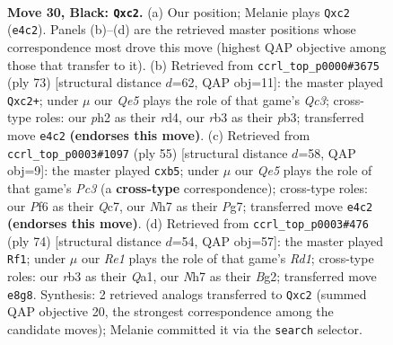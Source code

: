 \documentclass[11pt]{article}
\begin{document}
\clearpage

\begin{figure}[p]\centering
\begin{subfigure}{0.46\textwidth}\centering
\resizebox{\linewidth}{!}{%
\newchessgame
\chessboard[
  setfen={4r2k/p1pp3n/5p1Q/8/1PPPq3/1R6/2P2P1P/6K1 b - - 2 30},
  showmover=false,
  pgfstyle=straightmove, color=movearrow, markmove={e4-c2}
]}
\caption{}
\end{subfigure}\hfill
\begin{subfigure}{0.46\textwidth}\centering
\resizebox{\linewidth}{!}{%
\newchessgame
\chessboard[
  setfen={r5k1/p6p/1pq5/4Q2n/3R4/PP3PP1/2P3KP/8 b - - 1 37},
  showmover=false,
  pgfstyle=straightmove, color=movearrow, markmove={c6-c2}
]}
\caption{}
\end{subfigure}
\\[4pt]
\begin{subfigure}{0.46\textwidth}\centering
\resizebox{\linewidth}{!}{%
\newchessgame
\chessboard[
  setfen={r6k/2q2ppp/2p5/1P6/3Q1P2/1P6/6PP/5R1K b - - 0 28},
  showmover=false,
  pgfstyle=straightmove, color=movearrow, markmove={c6-b5}
]}
\caption{}
\end{subfigure}\hfill
\begin{subfigure}{0.46\textwidth}\centering
\resizebox{\linewidth}{!}{%
\newchessgame
\chessboard[
  setfen={6k1/3b1pp1/7p/2rp4/3N3P/3P2q1/6B1/Q2R2K1 w - - 0 38},
  showmover=false,
  pgfstyle=straightmove, color=movearrow, markmove={d1-f1}
]}
\caption{}
\end{subfigure}
\caption{\textbf{Move 30, Black: \texttt{Qxc2}.} (a) Our position; Melanie plays \texttt{Qxc2} (\texttt{e4c2}). Panels (b)--(d) are the retrieved master positions whose correspondence most drove this move (highest QAP objective among those that transfer to it). (b) Retrieved from \texttt{ccrl\_top\_p0000\#3675} (ply 73) [structural distance $d$=62, QAP obj=11]: the master played \texttt{Qxc2+}; under $\mu$ our \emph{Qe5} plays the role of that game's \emph{Qc3}; cross-type roles: our \emph{p}h2 as their \emph{r}d4, our \emph{r}b3 as their \emph{p}b3; transferred move \texttt{e4c2} \textbf{(endorses this move)}. (c) Retrieved from \texttt{ccrl\_top\_p0003\#1097} (ply 55) [structural distance $d$=58, QAP obj=9]: the master played \texttt{cxb5}; under $\mu$ our \emph{Qe5} plays the role of that game's \emph{Pc3} (a \textbf{cross-type} correspondence); cross-type roles: our \emph{P}f6 as their \emph{Q}c7, our \emph{N}h7 as their \emph{P}g7; transferred move \texttt{e4c2} \textbf{(endorses this move)}. (d) Retrieved from \texttt{ccrl\_top\_p0003\#476} (ply 74) [structural distance $d$=54, QAP obj=57]: the master played \texttt{Rf1}; under $\mu$ our \emph{Re1} plays the role of that game's \emph{Rd1}; cross-type roles: our \emph{r}b3 as their \emph{Q}a1, our \emph{N}h7 as their \emph{B}g2; transferred move \texttt{e8g8}. Synthesis: 2 retrieved analogs transferred to \texttt{Qxc2} (summed QAP objective 20, the strongest correspondence among the candidate moves); Melanie committed it via the \texttt{search} selector.}
\label{fig:thought-m59}
\end{figure}
\end{document}
